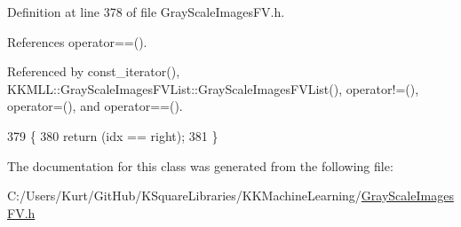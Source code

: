 Definition at line 378 of file Gray\+Scale\+Images\+F\+V.\+h.



References operator==().



Referenced by const\+\_\+iterator(), K\+K\+M\+L\+L\+::\+Gray\+Scale\+Images\+F\+V\+List\+::\+Gray\+Scale\+Images\+F\+V\+List(), operator!=(), operator=(), and operator==().


\begin{DoxyCode}
379       \{
380         \textcolor{keywordflow}{return}  (idx == right);
381       \}
\end{DoxyCode}


The documentation for this class was generated from the following file\+:\begin{DoxyCompactItemize}
\item 
C\+:/\+Users/\+Kurt/\+Git\+Hub/\+K\+Square\+Libraries/\+K\+K\+Machine\+Learning/\hyperlink{_gray_scale_images_f_v_8h}{Gray\+Scale\+Images\+F\+V.\+h}\end{DoxyCompactItemize}
